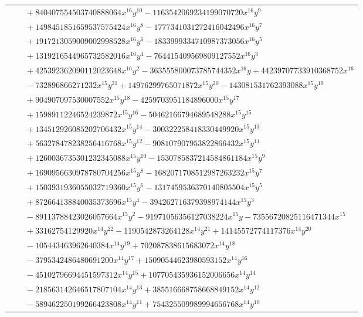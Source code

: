 \documentclass[11pt]{article}
\begin{document}
\begin{longtable}{@{}ll@{}}
 & $\quad +840407554503740888064x^{16}y^{10}-1163542069234199070720x^{16}y^{9}$\\
 & $\quad +1498451851659537575424x^{16}y^{8}-1777341031272416042496x^{16}y^{7}$\\
 & $\quad +1917213059009002998528x^{16}y^{6}-1833999334710987373056x^{16}y^{5}$\\
 & $\quad +1319216544965732582016x^{16}y^{4}-764415409569809127552x^{16}y^{3}$\\
 & $\quad +425392362090112023648x^{16}y^{2}-363555800073785744352x^{16}y+44239707733910368752x^{16}$\\
 & $\quad -732896866271232x^{15}y^{21}+14976299765071872x^{15}y^{20}-143081531762393088x^{15}y^{19}$\\
 & $\quad +904907097530007552x^{15}y^{18}-4259703951184896000x^{15}y^{17}$\\
 & $\quad +15989112246524239872x^{15}y^{16}-50462166794689548288x^{15}y^{15}$\\
 & $\quad +134512926085202706432x^{15}y^{14}-300322258418330449920x^{15}y^{13}$\\
 & $\quad +563278478238256416768x^{15}y^{12}-908107907953822866432x^{15}y^{11}$\\
 & $\quad +1260036735301232345088x^{15}y^{10}-1530785837214584861184x^{15}y^{9}$\\
 & $\quad +1690956630978780704256x^{15}y^{8}-1682071708512987263232x^{15}y^{7}$\\
 & $\quad +1503931936055032719360x^{15}y^{6}-1317459536370140805504x^{15}y^{5}$\\
 & $\quad +872664138840035373696x^{15}y^{4}-394262716379398974144x^{15}y^{3}$\\
 & $\quad -89113788423026057664x^{15}y^{2}-91971056356127038224x^{15}y-73556720825116471344x^{15}$\\
 & $\quad +33162754129920x^{14}y^{22}-1190542873264128x^{14}y^{21}+14145572774117376x^{14}y^{20}$\\
 & $\quad -105443463962640384x^{14}y^{19}+702087838615683072x^{14}y^{18}$\\
 & $\quad -3795342486480691200x^{14}y^{17}+15090544623980593152x^{14}y^{16}$\\
 & $\quad -45102796694451597312x^{14}y^{15}+107705435936152006656x^{14}y^{14}$\\
 & $\quad -218563142646517807104x^{14}y^{13}+385516668758668849152x^{14}y^{12}$\\
 & $\quad -589462250199266423808x^{14}y^{11}+754325509989994656768x^{14}y^{10}$\\

\end{longtable}
\end{document}

